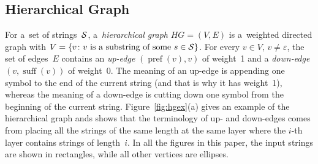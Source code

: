 \documentclass[11pt]{article}
\newtheorem{definition}{Definition}
\DeclareMathOperator{\pref}{pref}
\DeclareMathOperator{\suff}{suff}
\begin{document}
\subsection{Hierarchical Graph}
For a~set of strings~${\cal S}$, a~\emph{hierarchical graph} $HG=(V,E)$ is a~weighted directed graph with $V=\{v \colon \text{$v$ is a~substring of some $s \in {\cal S}$}\}$. For every $v \in V,\, v \neq \varepsilon$, the set of edges~$E$ contains an {\em up-edge} $(\pref(v), v)$ of weight~1 and a {\em down-edge} $(v, \suff(v))$ of weight~0. The meaning of an up-edge is appending one symbol to the end of the current string (and that is why it has weight~1), whereas the meaning of a down-edge is cutting down one symbol from the beginning of the current string.
%
Figure~\ref{fig:hgex}(a) gives an example of the hierarchical graph ands shows that the terminology of up- and down-edges comes from placing all the strings of the same length at the same layer where the $i$-th layer contains strings of length~$i$.  In all the figures in this paper, the input strings are shown in rectangles, while all other vertices are ellipses.

\newcommand{\we}[4]{
\begin{scope}[xshift=#1mm,yshift=#2mm]
\foreach \n/\x/\y in {aaa/0/3, cae/1/3, aec/3/3, eee/4/3}
  \node[inputvertex] (\n) at (\x,\y) {\tt \n};
%  
\foreach \n/\x/\y in {aa/0/2, ca/1/2, ae/2/2, ec/3/2, ee/4/2, a/1/1, c/2/1, e/3/1}
  \node[vertex] (\n) at (\x,\y) {\tt \n};
%
\node[vertex] (eps) at (2,0) {$\varepsilon$};
%
\foreach \f/\t/\a in {eps/e/10, e/eps/10, eps/c/10, c/eps/10, eps/a/10, a/eps/10, a/aa/10, aa/a/10, aa/aaa/10, aaa/aa/10, c/ca/0, ca/cae/0, cae/ae/0, ae/aec/0, aec/ec/0, ee/eee/10, eee/ee/10, e/ee/10, ee/e/10, ca/a/0, a/ae/0, ae/e/0, e/ec/0, ec/c/0}
  \path (\f) edge[hgedge,bend left=\a] (\t);
  
\node at (2,-1) {(#3)};

#4
\end{scope}
}
\end{document}
